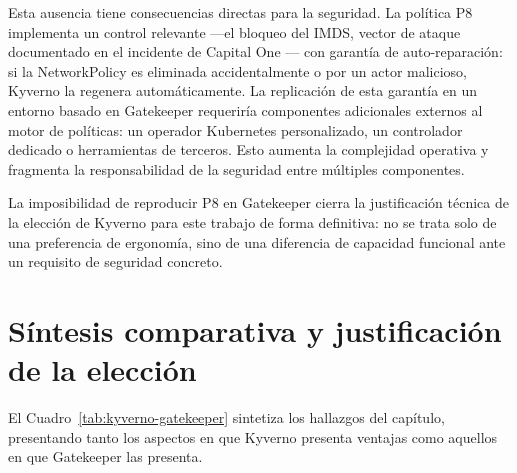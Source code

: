 Esta ausencia tiene consecuencias directas para la seguridad. La política P8 implementa un control relevante ---el bloqueo del IMDS, vector de ataque documentado en el incidente de Capital One \cite{capitalone2019}--- con garantía de auto-reparación: si la NetworkPolicy es eliminada accidentalmente o por un actor malicioso, Kyverno la regenera automáticamente. La replicación de esta garantía en un entorno basado en Gatekeeper requeriría componentes adicionales externos al motor de políticas: un operador Kubernetes personalizado, un controlador dedicado o herramientas de terceros. Esto aumenta la complejidad operativa y fragmenta la responsabilidad de la seguridad entre múltiples componentes.

La imposibilidad de reproducir P8 en Gatekeeper cierra la justificación técnica de la elección de Kyverno para este trabajo de forma definitiva: no se trata solo de una preferencia de ergonomía, sino de una diferencia de capacidad funcional ante un requisito de seguridad concreto.

\section{Síntesis comparativa y justificación de la elección}

El Cuadro~\ref{tab:kyverno-gatekeeper} sintetiza los hallazgos del capítulo, presentando tanto los aspectos en que Kyverno presenta ventajas como aquellos en que Gatekeeper las presenta.

